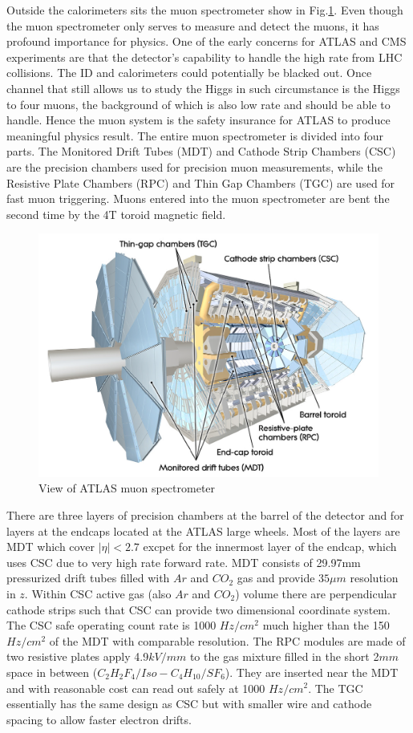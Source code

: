 \label{sec:detector-mu}
Outside the calorimeters sits the muon spectrometer show in Fig.\ref{fig:detector-mu}. Even though the muon spectrometer only serves to measure and detect the muons, it has profound importance for physics. One of the early concerns for ATLAS and CMS experiments are that the detector's capability to handle the high rate from LHC collisions. The ID and calorimeters could potentially be blacked out. Once channel that still allows us to study the Higgs in such circumstance is the Higgs to four muons, the background of which is also low rate and should be able to handle. Hence the muon system is the safety insurance for ATLAS to produce meaningful physics result. The entire muon spectrometer is divided into four parts. The Monitored Drift Tubes (MDT) and Cathode Strip Chambers (CSC) are the precision chambers used for precision muon measurements, while the Resistive Plate Chambers (RPC) and Thin Gap Chambers (TGC) are used for fast muon triggering. Muons entered into the muon spectrometer are bent the second time by the 4T toroid magnetic field. 

\begin{figure}[htpb!]
\begin{center}
  \includegraphics[width=0.8\linewidth]{figures/detector/muon}
\caption{View of ATLAS muon spectrometer}
\label{fig:detector-mu}
\end{center}
\end{figure}


There are three layers of precision chambers at the barrel of the detector and for layers at the endcaps located at the ATLAS large wheels. Most of the layers are MDT which cover $|\eta|<2.7$ excpet for the innermost layer of the endcap, which uses CSC due to very high rate forward rate. MDT consists of 29.97mm pressurized drift tubes filled with $Ar$ and $CO_2$ gas and provide $35\mu m$ resolution in $z$. Within CSC active gas (also $Ar$ and $CO_2$) volume there are perpendicular cathode strips such that CSC can provide two dimensional coordinate system. The CSC safe operating count rate is 1000 $Hz/cm^2$ much higher than the 150 $Hz/cm^2$ of the MDT with comparable resolution. The RPC modules are made of two resistive plates apply 4.9$kV/mm$ to the gas mixture filled in the short 2$mm$ space in between ($C_2H_2F_4/Iso-C_4H_{10}/SF_6$). They are inserted near the MDT and with reasonable cost can read out safely at 1000 $Hz/cm^2$. The TGC essentially has the same design as CSC but with smaller wire and cathode spacing to allow faster electron drifts. 

